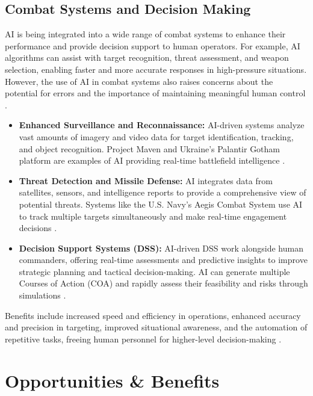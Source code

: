 \subsection{Combat Systems and Decision Making}
AI is being integrated into a wide range of combat systems to enhance their performance and provide decision support to human operators. For example, AI algorithms can assist with target recognition, threat assessment, and weapon selection, enabling faster and more accurate responses in high-pressure situations. However, the use of AI in combat systems also raises concerns about the potential for errors and the importance of maintaining meaningful human control \cite{dignum2019responsible}.
\begin{itemize}
    \item \textbf{Enhanced Surveillance and Reconnaissance:} AI-driven systems analyze vast amounts of imagery and video data for target identification, tracking, and object recognition. Project Maven and Ukraine's Palantir Gotham platform are examples of AI providing real-time battlefield intelligence \cite{TheAIInnovator_CombatSystems, DigitalDefynd_CombatSystems}.
    \item \textbf{Threat Detection and Missile Defense:} AI integrates data from satellites, sensors, and intelligence reports to provide a comprehensive view of potential threats. Systems like the U.S. Navy's Aegis Combat System use AI to track multiple targets simultaneously and make real-time engagement decisions \cite{FlySight_CombatSystems}.
    \item \textbf{Decision Support Systems (DSS):} AI-driven DSS work alongside human commanders, offering real-time assessments and predictive insights to improve strategic planning and tactical decision-making. AI can generate multiple Courses of Action (COA) and rapidly assess their feasibility and risks through simulations \cite{ArmyMil_CombatSystems, Georgetown_CombatSystems}.
\end{itemize}
Benefits include increased speed and efficiency in operations, enhanced accuracy and precision in targeting, improved situational awareness, and the automation of repetitive tasks, freeing human personnel for higher-level decision-making \cite{SmartCityConsultant_CombatSystems, BusinessOfGovernment_CombatSystems}.

\section{Opportunities \& Benefits}

